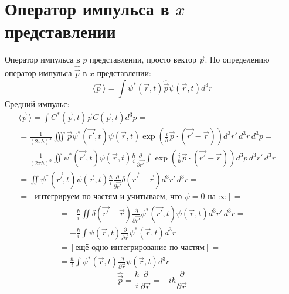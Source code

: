 \section{Оператор импульса в $x$ представлении}
Оператор импульса в $p$ представлении, просто вектор $\vec{p}$. 
По определению оператор импульса $\hat{\vec{p}}$ в $x$ представлении:
\[
	\langle \vec{p} \,\rangle = \int \psi^*(\vec{r}, t) \hat{\vec{p}} \psi(\vec{r}, t) d^3r
\]
Средний импульс:
\[
	\begin{gathered}
	\langle \vec{p} \,\rangle = 
	\int C^*(\vec{p}, t) \vec{p} C(\vec{p}, t) d^3p = \\ =
	\frac{1}{(2\pi\hbar)^{3}} \iiint \vec{p} \psi^*(\vec{r'}, t) \psi(\vec{r}, t) \exp \left(\frac{i}{\hbar} \vec{p} \cdot (\vec{r'} - \vec{r})\right) d^3r'\, d^3r\, d^3p = \\ =
	\frac{1}{(2\pi\hbar)^{3}} \iint \psi^*(\vec{r'}, t) \psi(\vec{r}, t) \frac{\hbar}{i}\frac{\partial}{\partial \vec{r'}}\int\exp \left(\frac{i}{\hbar} \vec{p} \cdot (\vec{r'} - \vec{r})\right) d^3p\, d^3r'\, d^3r = \\ =
	\iint \psi^*(\vec{r'}, t) \psi(\vec{r}, t) \frac{\hbar}{i} \frac{\partial}{\partial \vec{r'}} \delta(\vec{r'} - \vec{r}) d^3r'\, d^3r = \\ =
	[\text{интегрируем по частям и учитываем, что $\psi = 0$ на $\infty$}] =
	\end{gathered}
\]
\[
	\begin{gathered}
	= - \frac{\hbar}{i} \iint \delta(\vec{r'} - \vec{r}) \frac{\partial}{\partial \vec{r'}} \psi^*(\vec{r'}, t) \psi(\vec{r}, t) d^3r'\, d^3r = \\ =
	- \frac{\hbar}{i} \int \psi(\vec{r}, t) \frac{\partial}{\partial \vec{r}} \psi^*(\vec{r}, t) d^3r = \\ =
	[\text{ещё одно интегрирование по частям}] = \\ =
	\frac{\hbar}{i} \int \psi^*(\vec{r}, t) \frac{\partial}{\partial \vec{r}} \psi(\vec{r}, t) d^3r
	\end{gathered}
\]
\[
	\hat{\vec{p}} = \frac{\hbar}{i} \frac{\partial}{\partial \vec{r}} = - i \hbar \frac{\partial}{\partial \vec{r}}
\]

